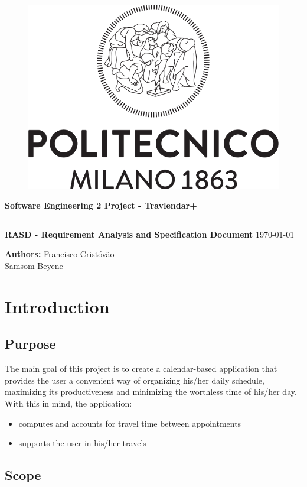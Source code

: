 \documentclass[12pt]{article}
\begin{document}
\begin{titlepage}
    \begin{center}
    \begin{figure}
        \centering
        \includegraphics[scale=0.2]{logoPolimi.png}
        \vspace{1.5cm}
    \end{figure}

    \Huge\textbf{Software Engineering 2 Project - Travlendar+}
    \rule{12cm}{0.5pt}
    \Huge\textbf{RASD - Requirement Analysis and Specification Document}
    \today
    \end{center}
    
    \vspace{3cm}
    
    \begin{flushleft}
        \LARGE\textbf{Authors: }
        \newline\newline
        \Large\texttt{}{Francisco Cristóvão \\ Samsom Beyene}
    \end{flushleft}



\end{titlepage}

\newpage
  \tableofcontents
\newpage

\section{Introduction}
\subsection{Purpose}
The main goal of this project is to create a calendar-based application that provides the user a convenient way of organizing his/her daily schedule, maximizing its productiveness and minimizing the worthless time of his/her day. With this in mind, the application:
\begin{itemize}
\item computes and accounts for travel time between appointments
\item supports the user in his/her travels
\end{itemize}
\subsection{Scope}
\end{document}
